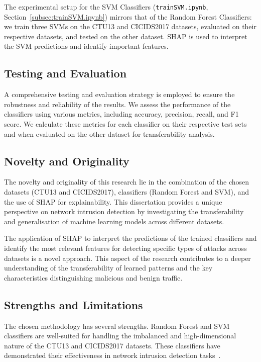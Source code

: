 The experimental setup for the SVM Classifiers (\texttt{trainSVM.ipynb}, Section~\ref{subsec:trainSVM.ipynb}) mirrors that of the Random Forest Classifiers: we train three SVMs on the CTU13 and CICIDS2017 datasets, evaluated on their respective datasets, and tested on the other dataset. SHAP is used to interpret the SVM predictions and identify important features.

\subsection{Testing and Evaluation}\label{subsec:testing-evaluation}
A comprehensive testing and evaluation strategy is employed to ensure the robustness and reliability of the results. We assess the performance of the classifiers using various metrics, including accuracy, precision, recall, and F1 score. We calculate these metrics for each classifier on their respective test sets and when evaluated on the other dataset for transferability analysis.

\subsection{Novelty and Originality}\label{subsec:novelty-originality}
The novelty and originality of this research lie in the combination of the chosen datasets (CTU13 and CICIDS2017), classifiers (Random Forest and SVM), and the use of SHAP for explainability. This dissertation provides a unique perspective on network intrusion detection by investigating the transferability and generalisation of machine learning models across different datasets.

The application of SHAP to interpret the predictions of the trained classifiers and identify the most relevant features for detecting specific types of attacks across datasets is a novel approach. This aspect of the research contributes to a deeper understanding of the transferability of learned patterns and the key characteristics distinguishing malicious and benign traffic.

\subsection{Strengths and Limitations}\label{subsec:strengths-limitations}
The chosen methodology has several strengths. Random Forest and SVM classifiers are well-suited for handling the imbalanced and high-dimensional nature of the CTU13 and CICIDS2017 datasets. These classifiers have demonstrated their effectiveness in network intrusion detection tasks~\cite{farnaaz2016random, teng2017svm}.

